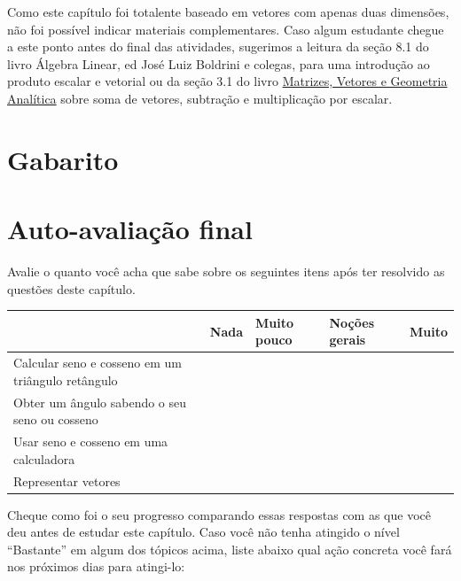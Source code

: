 \documentclass[main.tex]{subfiles}
\begin{document}
Como este capítulo foi totalente baseado em vetores com apenas duas dimensões, não foi possível indicar materiais complementares. Caso algum estudante chegue a este ponto antes do final das atividades, sugerimos a leitura da seção 8.1 do livro Álgebra Linear, ed José Luiz Boldrini e colegas, para uma introdução ao produto escalar e vetorial ou da seção 3.1 do livro \href{https://regijs.github.io/livros.html}{Matrizes, Vetores e Geometria Analítica} sobre soma de vetores, subtração e multiplicação por escalar.

\newpage

\section{Gabarito}

\imprimeGabarito

\paraAlunos

\section{Auto-avaliação final}
Avalie o quanto você acha que sabe sobre os seguintes itens após ter resolvido as questões deste capítulo.

\begin{center}
 \begin{tabular}{|p{25mm}||p{10mm}|p{10mm}|p{10mm}|p{10mm}|} 
 \hline
   & Nada & Muito pouco & Noções gerais & Muito\\
 \hline
 Calcular seno e cosseno em um triângulo retângulo &  &  &  &  \\ 
 \hline
 Obter um ângulo sabendo o seu seno ou cosseno &  &  &  &  \\
 \hline
 Usar seno e cosseno em uma calculadora &  &  &  &  \\
 \hline
 Representar vetores &  &  &  &  \\
 \hline
\end{tabular}
\end{center}

Cheque como foi o seu progresso comparando essas respostas com as que você deu antes de estudar este capítulo. Caso você não tenha atingido o nível ``Bastante''  em algum dos tópicos acima, liste abaixo qual ação concreta você fará nos próximos dias para atingi-lo:

\paraAmbos
\end{document}
